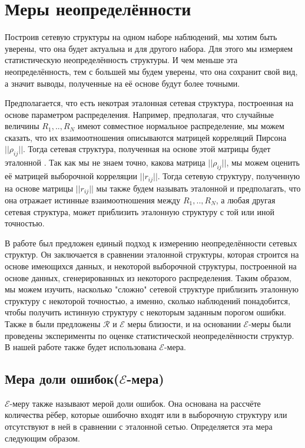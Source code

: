 \section{Меры неопределённости}

Построив сетевую структуры на одном наборе наблюдений, мы хотим быть уверены, что она будет актуальна и для другого набора. Для этого мы измеряем статистическую неопределённость структуры. И чем меньше эта неопределённость, тем с большей мы будем  уверены, что она сохранит свой вид, а значит выводы, полученные на её основе будут более точными. 

Предполагается, что есть некотрая эталонная сетевая структура, построенная на основе параметром распределения. Например, предполагая, что случайные величины $R_1, .., R_N$ имеют совместное нормальное распределение, мы можем сказать, что их взаимоотношения описываются матрицей корреляций Пирсона $||\rho_{i j}||$. Тогда сетевая структура, полученная на основе этой матрицы будет эталонной \cite{measures}. Так как мы не знаем точно, какова матрица $||\rho_{i j}||$, мы можем оценить её матрицей выборочной корреляции $||r_{i j}||$. Тогда сетевую структуру, полученную на основе  матрицы $||r_{i j}||$ мы также будем называть эталонной и предполагать, что она отражает истинные взаимоотношения между $R_1, .., R_N$,  а любая другая сетевая структура, может приблизить эталонную структуру с той или иной точностью. 


В работе \cite{measures} был предложен единый подход к измерению неопределённости сетевых структур. Он заключается в сравнении эталонной структуры, которая строится на основе имеющихся данных, и некоторой выборочной структуры, построенной на основе данных, сгенерированных из некоторого распределения. Таким образом, мы можем изучить, насколько "сложно" сетевой структуре приблизить эталонную структуру с некоторой точностью, а именно, сколько наблюдений понадобится, чтобы получить истинную структуру с некоторым заданным порогом ошибки. Также  в \cite{measures} были предложены $\mathcal{R}$ и $\mathcal{E}$ меры близости, и на основании $\mathcal{E}$-меры были проведены эксперименты по оценке статистической неопределённости структур. В нашей работе также будет использована $\mathcal{E}$-мера.


\subsection{Мера доли ошибок($\mathcal{E}$-мера)}

$\mathcal{E}$-меру также называют мерой доли ошибок. Она основана на рассчёте количества рёбер, которые ошибочно входят или в выборочную структуру или отсутствуют в ней в сравнении с эталонной сетью.
Определяется эта мера следующим образом.


